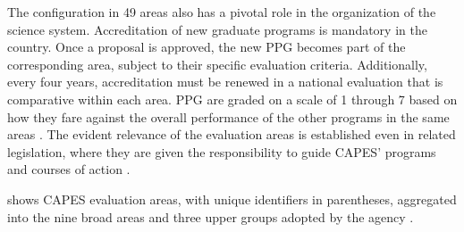 The configuration in 49 areas also has a pivotal role in the organization of the science system. Accreditation of new graduate programs is mandatory in the country. Once a proposal is approved, the new PPG becomes part of the corresponding area, subject to their specific evaluation criteria. Additionally, every four years, accreditation must be renewed in a national evaluation that is comparative within each area. PPG are graded on a scale of 1 through 7 based on how they fare against the overall performance of the other programs in the same areas \autocite{Brasil.2022e, 122/2021}. The evident relevance of the evaluation areas is established even in related legislation, where they are given the responsibility to guide CAPES' programs and courses of action \autocite{141/2016}. 

 shows CAPES evaluation areas, with unique identifiers in parentheses, aggregated into the nine broad areas and three upper groups adopted by the agency \autocite{CAPES.2020tb}.

